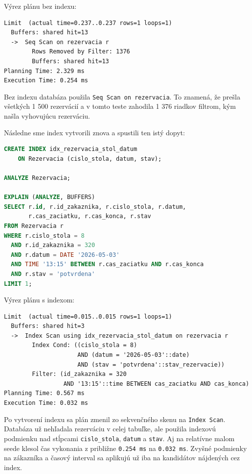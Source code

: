 \documentclass[11pt, a4paper]{article}
\begin{document}
Výrez plánu bez indexu:

\begin{lstlisting}
Limit  (actual time=0.237..0.237 rows=1 loops=1)
  Buffers: shared hit=13
  ->  Seq Scan on rezervacia r
        Rows Removed by Filter: 1376
        Buffers: shared hit=13
Planning Time: 2.329 ms
Execution Time: 0.254 ms
\end{lstlisting}

Bez indexu databáza použila \texttt{Seq Scan on rezervacia}. To znamená, že prešla všetkých
1 500 rezervácií a v tomto teste zahodila 1 376 riadkov filtrom, kým našla vyhovujúcu rezerváciu.

Následne sme index vytvorili znova a spustili ten istý dopyt:

\begin{lstlisting}[language=SQL]
CREATE INDEX idx_rezervacia_stol_datum
    ON Rezervacia (cislo_stola, datum, stav);

ANALYZE Rezervacia;

EXPLAIN (ANALYZE, BUFFERS)
SELECT r.id, r.id_zakaznika, r.cislo_stola, r.datum,
       r.cas_zaciatku, r.cas_konca, r.stav
FROM Rezervacia r
WHERE r.cislo_stola = 8
  AND r.id_zakaznika = 320
  AND r.datum = DATE '2026-05-03'
  AND TIME '13:15' BETWEEN r.cas_zaciatku AND r.cas_konca
  AND r.stav = 'potvrdena'
LIMIT 1;
\end{lstlisting}

Výrez plánu s indexom:

\begin{lstlisting}
Limit  (actual time=0.015..0.015 rows=1 loops=1)
  Buffers: shared hit=3
  ->  Index Scan using idx_rezervacia_stol_datum on rezervacia r
        Index Cond: ((cislo_stola = 8)
                     AND (datum = '2026-05-03'::date)
                     AND (stav = 'potvrdena'::stav_rezervacie))
        Filter: (id_zakaznika = 320
                 AND '13:15'::time BETWEEN cas_zaciatku AND cas_konca)
Planning Time: 0.567 ms
Execution Time: 0.032 ms
\end{lstlisting}

Po vytvorení indexu sa plán zmenil zo sekvenčného skenu na \texttt{Index Scan}. Databáza už
nehľadala rezerváciu v celej tabuľke, ale použila indexovú podmienku nad stĺpcami
\texttt{cislo\_stola}, \texttt{datum} a \texttt{stav}. Aj na relatívne malom seede klesol čas
vykonania z približne \texttt{0.254 ms} na \texttt{0.032 ms}. Zvyšné podmienky na zákazníka a časový
interval sa aplikujú už iba na kandidátov nájdených cez index.
\end{document}
